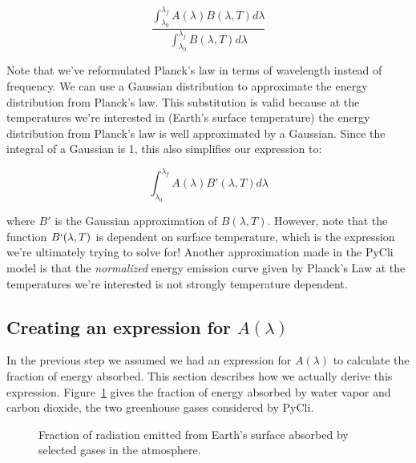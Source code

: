 \documentclass[12pt]{article} %
\begin{document}
$$\frac{\int_{\lambda_0}^{\lambda_f} A(\lambda) B(\lambda, T) d\lambda}{\int_{\lambda_0}^{\lambda_f} B(\lambda, T) d\lambda }$$

Note that we've reformulated Planck's law in terms of wavelength instead of frequency. We can use a Gaussian distribution to approximate the energy distribution from Planck's law. This substitution is valid because at the temperatures we're interested in (Earth's surface temperature) the energy distribution from Planck's law is well approximated by a Gaussian. Since the integral of a Gaussian is 1, this also simplifies our expression to:

$$\int_{\lambda_0}^{\lambda_f} A(\lambda) B'(\lambda, T) d\lambda$$

where $B'$ is the Gaussian approximation of $B(\lambda, T)$. However, note that the function $B`(\lambda, T)$ is dependent on surface temperature, which is the expression we're ultimately trying to solve for! Another approximation made in the PyCli model is that the \textit{normalized} energy emission curve given by Planck's Law at the temperatures we're interested is not strongly temperature dependent.

\subsection{Creating an expression for $A(\lambda)$}

In the previous step we assumed we had an expression for $A(\lambda)$ to calculate the fraction of energy absorbed. This section describes how we actually derive this expression. Figure~\ref{fig:absorption} gives the fraction of energy absorbed by water vapor and carbon dioxide, the two greenhouse gases considered by PyCli.

\begin{figure}[H]
	\caption{Fraction of radiation emitted from Earth's surface absorbed by selected gases in the atmosphere.}
	\label{fig:absorption}
\end{figure}
\end{document}

